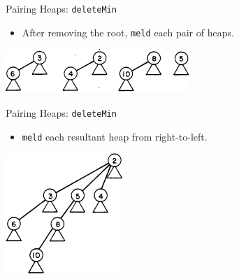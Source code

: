 \documentclass{beamer}
\begin{document}
\begin{frame}{Pairing Heaps: \texttt{deleteMin}}
  \begin{itemize}
    \item After removing the root, \texttt{meld} each pair of heaps.
  \end{itemize}
  \includegraphics[scale=1.0]{img/deleteMin2.png}
\end{frame}

\begin{frame}{Pairing Heaps: \texttt{deleteMin}}
  \begin{itemize}
    \item \texttt{meld} each resultant heap from right-to-left.
  \end{itemize}
  \includegraphics[scale=1.0]{img/deleteMin3.png}
\end{frame}
\end{document}
